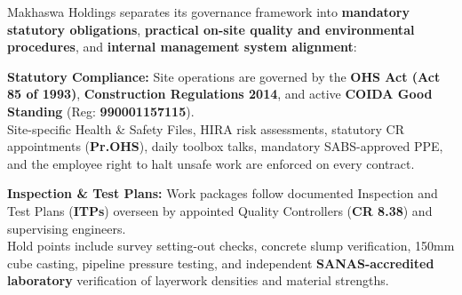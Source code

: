 \documentclass[a4paper,11pt]{article}
\providecommand{\faShieldAlt}{\faShield*}
\begin{document}
\noindent
{\fontsize{8.7pt}{12.2pt}\selectfont\color{mhtext}
Makhaswa Holdings separates its governance framework into \textbf{mandatory statutory obligations}, \textbf{practical on-site quality and environmental procedures}, and \textbf{internal management system alignment}:
}

\vspace{0.14cm}

\noindent
\begin{minipage}[t]{0.32\textwidth}
    \begin{tcolorbox}[
        enhanced, colback=white, colframe=mhlightgray, boxrule=0.8pt, arc=4pt,
        title={\bfseries\color{white}\faShieldAlt\ Occupational Health \& Safety},
        colbacktitle=mhnavy, fonttitle=\bfseries\footnotesize,
        left=7pt, right=7pt, top=7pt, bottom=7pt, height=6.4cm,
        drop shadow=black!4
    ]
        {\fontsize{8.1pt}{11.3pt}\selectfont\color{mhtext}
        \textbf{Statutory Compliance:} Site operations are governed by the \textbf{OHS Act (Act 85 of 1993)}, \textbf{Construction Regulations 2014}, and active \textbf{COIDA Good Standing} (Reg: \textbf{990001157115}).\\[4pt]
        Site-specific Health \& Safety Files, HIRA risk assessments, statutory CR appointments (\textbf{Pr.OHS}), daily toolbox talks, mandatory SABS-approved PPE, and the employee right to halt unsafe work are enforced on every contract.
        }
    \end{tcolorbox}
\end{minipage}
\hfill
\begin{minipage}[t]{0.32\textwidth}
    \begin{tcolorbox}[
        enhanced, colback=white, colframe=mhlightgray, boxrule=0.8pt, arc=4pt,
        title={\bfseries\color{white}\faCheckDouble\ Quality Control \& Testing},
        colbacktitle=mhblue, fonttitle=\bfseries\footnotesize,
        left=7pt, right=7pt, top=7pt, bottom=7pt, height=6.4cm,
        drop shadow=black!4
    ]
        {\fontsize{8.1pt}{11.3pt}\selectfont\color{mhtext}
        \textbf{Inspection \& Test Plans:} Work packages follow documented Inspection and Test Plans (\textbf{ITPs}) overseen by appointed Quality Controllers (\textbf{CR 8.38}) and supervising engineers.\\[4pt]
        Hold points include survey setting-out checks, concrete slump verification, 150mm cube casting, pipeline pressure testing, and independent \textbf{SANAS-accredited laboratory} verification of layerwork densities and material strengths.
        }
    \end{tcolorbox}
\end{minipage}
\end{document}
